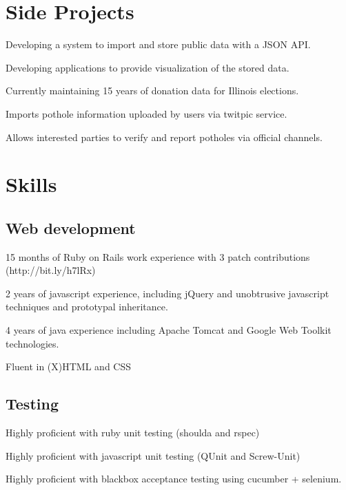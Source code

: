 \documentclass{resume}
\begin{document}
\section{Side Projects}
\begin{compactitem}
  \item Developing a system to import and store public data with a JSON API.
  \item Developing applications to provide visualization of the stored data.
  \item Currently maintaining 15 years of donation data for Illinois elections.
\end{compactitem}

\begin{compactitem}
  \item Imports pothole information uploaded by users via twitpic service.
  \item Allows interested parties to verify and report potholes via official channels.
\end{compactitem}

\section{Skills}

\subsection{Web development}

\begin{compactitem}
  \item 15 months of Ruby on Rails work experience with 3 patch contributions (http://bit.ly/h7lRx)
  \item 2 years of javascript experience, including jQuery and unobtrusive javascript techniques and prototypal inheritance.
  \item 4 years of java experience including Apache Tomcat and Google Web Toolkit technologies.
  \item Fluent in (X)HTML and CSS
\end{compactitem}

\subsection{Testing}
\begin{compactitem}
  \item Highly proficient with ruby unit testing (shoulda and rspec)
  \item Highly proficient with javascript unit testing (QUnit and Screw-Unit)
  \item Highly proficient with blackbox acceptance testing using cucumber + selenium.
\end{compactitem}
\end{document}
